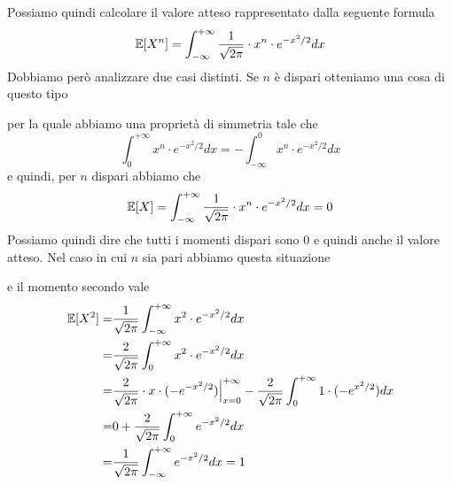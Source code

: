 Possiamo quindi calcolare il valore atteso rappresentato dalla seguente formula
\[ \mathbb{E}[X^n] = \int_{-\infty}^{+\infty} \frac{1}{\sqrt{2 \pi}} \cdot x^n \cdot e^{-x^2 / 2} dx \]
Dobbiamo però analizzare due casi distinti. Se $n$ è dispari otteniamo una cosa di questo tipo
\begin{center}
\end{center}
per la quale abbiamo una proprietà di simmetria tale che
\[ \int_{0}^{+\infty} x^n \cdot e^{-x^2/2} dx = - \int_{-\infty}^{0} x^n \cdot e^{-x^2/2} dx \]
e quindi, per $n$ dispari abbiamo che
\[ \mathbb{E}[X] = \int_{-\infty}^{+\infty} \frac{1}{\sqrt{2 \pi}} \cdot x^n \cdot e^{-x^2/2} dx = 0 \]
Possiamo quindi dire che tutti i momenti dispari sono 0 e quindi anche il valore atteso. Nel caso
in cui $n$ sia pari abbiamo questa situazione
\begin{center}
\end{center}
e il momento secondo vale
\begin{align*}
	\mathbb{E}[X^2] = & \frac{1}{\sqrt{2 \pi}} \int_{-\infty}^{+\infty} x^2 \cdot e^{-x^2/2} dx    \\
	=         & \frac{2}{\sqrt{2 \pi}} \int_{0}^{+\infty} x^2 \cdot e^{-x^2/2} dx          \\
	=         & \frac{2}{\sqrt{2 \pi}} \cdot x \cdot (-e^{-x^2/2}) \Big|_{x=0}^{+\infty} -
	\frac{2}{\sqrt{2 \pi}} \int_{0}^{+\infty} 1 \cdot (-e^{x^2/2}) dx                      \\
	=         & 0 + \frac{2}{\sqrt{2 \pi}} \int_{0}^{+\infty} e^{-x^2/2} dx                \\
	=         & \frac{1}{\sqrt{2 \pi}} \int_{-\infty}^{+\infty} e^{-x^2/2} dx = 1
\end{align*}
